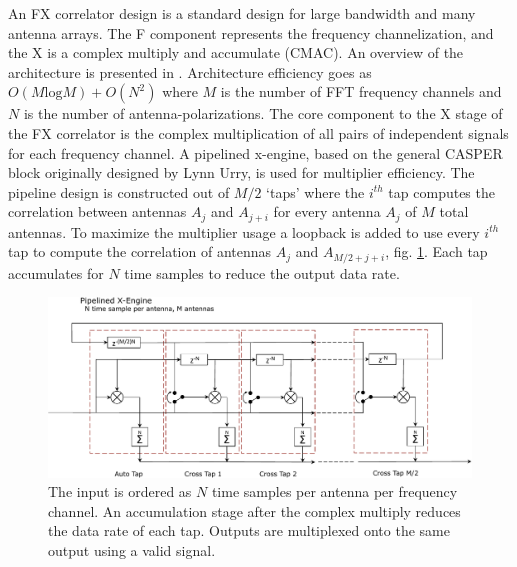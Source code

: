 \documentclass[useAMS,macros,usenatbib,onecolumn]{mn2e}
\begin{document}
An FX correlator design is a standard design for large bandwidth and many antenna arrays.
The F component represents the frequency channelization, and the X is a complex multiply and accumulate (CMAC).
An overview of the architecture is presented in \citep{casper}.
Architecture efficiency goes as $O( M \textrm{log} M) + O( N^2)$ where $M$ is the number of FFT frequency channels and $N$ is the number of antenna-polarizations.
The core component to the X stage of the FX correlator is the complex multiplication of all pairs of independent signals for each frequency channel.
A pipelined x-engine, based on the general CASPER block originally designed by Lynn Urry\citep{fxcorrelator}, is used for multiplier efficiency.
The pipeline design is constructed out of $M/2$ `taps' where the $i^{th}$ tap computes the correlation between antennas $A_j$ and $A_{j+i}$ for every antenna $A_j$ of $M$ total antennas.
To maximize the multiplier usage a loopback is added to use every $i^{th}$ tap to compute the correlation of antennas $A_j$ and $A_{M/2+j+i}$, fig. \ref{fig:xeng_pipe}.
Each tap accumulates for $N$ time samples to reduce the output data rate.

\begin{figure}
    \centering
    \includegraphics[scale=0.6]{graphics/crop_pipelined_xeng.pdf}
    \caption{The input is ordered as $N$ time samples per antenna per frequency channel. An accumulation stage after the complex multiply reduces the data rate of each tap. Outputs are multiplexed onto the same output using a valid signal.}
    \label{fig:xeng_pipe}
\end{figure}
\end{document}
